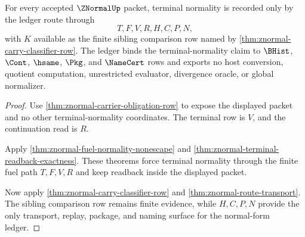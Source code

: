 \begin{theorem}
\label{thm:znormal-normal-form-ledger-row}
For every accepted $\ZNormalUp$ packet, terminal normality is recorded only by the ledger route through
$$
T,F,V,R,H,C,P,N,
$$
with $K$ available as the finite sibling comparison row named by \autoref{thm:znormal-carry-classifier-row}. The ledger binds the terminal-normality claim to $\BHist$, $\Cont$, $\hsame$, $\Pkg$, and $\NameCert$ rows and exports no host conversion, quotient computation, unrestricted evaluator, divergence oracle, or global normalizer.
\end{theorem}
\begin{proof}
Use \autoref{thm:znormal-carrier-obligation-row} to expose the displayed packet and no other terminal-normality coordinates. The terminal row is $V$, and the continuation read is $R$.

Apply \autoref{thm:znormal-fuel-normality-nonescape} and \autoref{thm:znormal-terminal-readback-exactness}. These theorems force terminal normality through the finite fuel path $T,F,V,R$ and keep readback inside the displayed packet.

Now apply \autoref{thm:znormal-carry-classifier-row} and \autoref{thm:znormal-route-transport}. The sibling comparison row remains finite evidence, while $H,C,P,N$ provide the only transport, replay, package, and naming surface for the normal-form ledger.
\end{proof}

